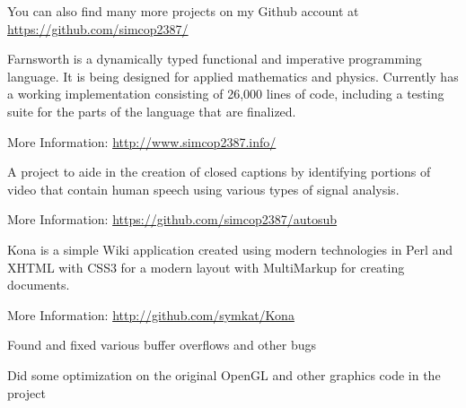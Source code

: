 \documentclass[table,tmargin=1in,bmargin=1in,letterpaper]{resume}
\begin{document}
\begin{compactitem}
\item You can also find many more projects on my Github account at \url{https://github.com/simcop2387/}
\end{compactitem}


\begin{compactitem}
\item Farnsworth is a dynamically typed functional and imperative programming language.  
It is being designed for applied mathematics and physics.  Currently has a working implementation 
consisting of 26,000 lines of code, including a testing suite for the parts of the language that are finalized.
\item More Information: \url{http://www.simcop2387.info/}
\end{compactitem}


\begin{compactitem}
\item A project to aide in the creation of closed captions by identifying portions of 
video that contain human speech using various types of signal analysis.
\item More Information: \url{https://github.com/simcop2387/autosub}
\end{compactitem}


\begin{compactitem}
\item Kona is a simple Wiki application created using modern technologies in Perl and XHTML 
with CSS3 for a modern layout with MultiMarkup for creating documents.
\item More Information: \url{http://github.com/symkat/Kona}
\end{compactitem}


\begin{compactitem}
\item Found and fixed various buffer overflows and other bugs
\item Did some optimization on the original OpenGL and other graphics code in the project
\end{compactitem}
\end{document}
